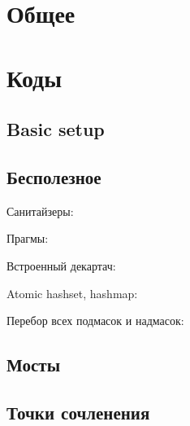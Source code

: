 \documentclass[a4paper]{article}
\begin{document}
\begin{multicols*}{2}

    \tableofcontents

    \section{Общее}
        
    
    \section{Коды}
        
        \subsection{Basic setup}
            

        \subsection{Бесполезное}
            Санитайзеры:
                
            
            Прагмы:
                
            
            Встроенный декартач:
                
                
            Atomic hashset, hashmap:
                
                
            Перебор всех подмасок и надмасок:
                
    
        \subsection{Мосты}
            
            
        \subsection{Точки сочленения}
            
            

\end{multicols*}
\end{document}
